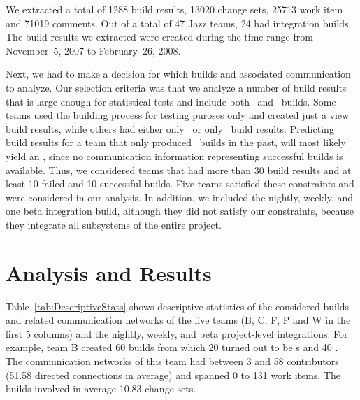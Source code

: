 We extracted a total of 1288 build results, 13020 change sets, 25713 work item
and 71019 comments. Out of a total of 47 Jazz teams, 24 had integration builds.
The build results we extracted were created during the time range from
November~5, 2007 to February~26, 2008.

Next, we had to make a decision for which builds and associated communication to
analyze. Our selection criteria was that we analyze a number of build results
that is large enough for statistical tests and include both \ok\ and \error\
builds. Some teams used the building process for testing puroses only and created
just a view build results, while others had either only \ok\ or only \error\
build results. Predicting build results for a team that only produced \error\
builds in the past, will most likely yield an \error, since no communication
information representing successful builds is available. Thus, we considered
teams that had more than 30 build results and at least 10 failed and 10
successful builds. Five teams satisfied these constraints and were considered in
our analysis. In addition, we included the nightly, weekly, and one beta
integration build, although they did not satisfy our constraints, because 
they integrate all subsystems of the entire project.






\section{Analysis and Results}
\label{sec:AnalysisResults}
Table~\ref{tab:DescriptiveStats} shows descriptive statistics of the considered
builds and related communication networks of the five teams (B, C, F, P and W in
the first 5 columns) and the nightly, weekly, and beta project-level
integrations. For example, team B created 60 builds from which 20 turned out to
be \error s and 40 \ok. The communication networks of this team had between 3 and
58 contributors (51.58 directed connections in average) and spanned 0 to 131 work
items. The builds involved in average 10.83 change sets.

